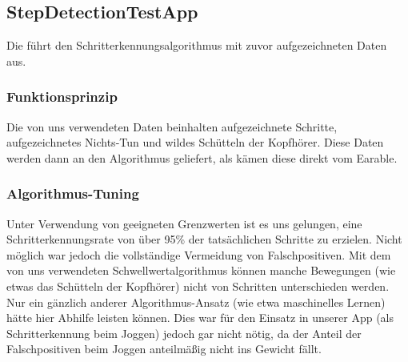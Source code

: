 \documentclass[../implementierung.tex]{subfiles}
\begin{document}
\subsection{StepDetectionTestApp}

	Die  führt den Schritterkennungsalgorithmus mit zuvor aufgezeichneten Daten aus.

	\subsubsection{Funktionsprinzip}
		Die von uns verwendeten Daten beinhalten aufgezeichnete Schritte, aufgezeichnetes Nichts-Tun und wildes Schütteln der Kopfhörer.
		Diese Daten werden dann an den Algorithmus geliefert, als kämen diese direkt vom Earable.

	\subsubsection{Algorithmus-Tuning}
		Unter Verwendung von geeigneten Grenzwerten ist es uns gelungen, eine Schritterkennungsrate von über 95\% der tatsächlichen Schritte zu erzielen.
		Nicht möglich war jedoch die vollständige Vermeidung von Falschpositiven.
		Mit dem von uns verwendeten Schwellwertalgorithmus können manche Bewegungen (wie etwas das Schütteln der Kopfhörer) nicht von Schritten unterschieden werden.
		Nur ein gänzlich anderer Algorithmus-Ansatz (wie etwa maschinelles Lernen) hätte hier Abhilfe leisten können.
		Dies war für den Einsatz in unserer App (als Schritterkennung beim Joggen) jedoch gar nicht nötig, da der Anteil der Falschpositiven beim Joggen anteilmäßig nicht ins Gewicht fällt.
\end{document}
